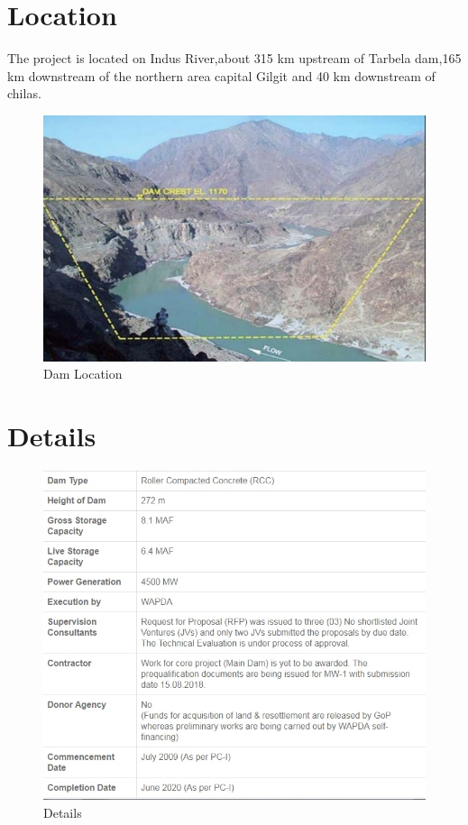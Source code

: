 \documentclass[11pt, journal,letterpaper,compsoc]{IEEEtran}
\begin{document}
\section{Location}
The project is located on Indus River,about 315 km upstream of Tarbela dam,165 km downstream of the northern area capital Gilgit and 40 km downstream of chilas.
\begin{figure}  [h!]
\includegraphics[width=\linewidth]{images/dam-location}
\caption{Dam Location}
\label{fig:dam1}
\end{figure}

\section{Details}
\begin{figure}  [h!]
\includegraphics[width=\linewidth]{images/detail}
\caption{Details}
\label{fig:dam2}
\end{figure}
\end{document}
